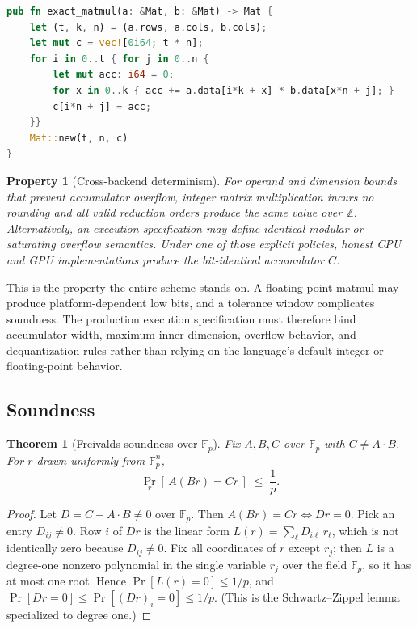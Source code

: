 \documentclass[11pt,a4paper]{article}
\newtheorem{theorem}{Theorem}
\newtheorem{property}{Property}
\begin{document}
\begin{lstlisting}[language=Rust,caption={The exact-integer matmul; identical in Go (\texttt{crypto/poi.ExactMatmul}).}]
pub fn exact_matmul(a: &Mat, b: &Mat) -> Mat {
    let (t, k, n) = (a.rows, a.cols, b.cols);
    let mut c = vec![0i64; t * n];
    for i in 0..t { for j in 0..n {
        let mut acc: i64 = 0;
        for x in 0..k { acc += a.data[i*k + x] * b.data[x*n + j]; }
        c[i*n + j] = acc;
    }}
    Mat::new(t, n, c)
}
\end{lstlisting}

\begin{property}[Cross-backend determinism]\label{prop:det}
For operand and dimension bounds that prevent accumulator overflow, integer matrix multiplication incurs no rounding and all valid reduction orders produce the same value over $\mathbb{Z}$. Alternatively, an execution specification may define identical modular or saturating overflow semantics. Under one of those explicit policies, honest CPU and GPU implementations produce the bit-identical accumulator $C$.
\end{property}

This is the property the entire scheme stands on. A floating-point matmul may produce platform-dependent low bits, and a tolerance window complicates soundness. The production execution specification must therefore bind accumulator width, maximum inner dimension, overflow behavior, and dequantization rules rather than relying on the language's default integer or floating-point behavior.

\subsection{Soundness}

\begin{theorem}[Freivalds soundness over $\mathbb{F}_p$]\label{thm:freivalds}
Fix $A, B, C$ over $\mathbb{F}_p$ with $C \neq A \cdot B$. For $r$ drawn uniformly from $\mathbb{F}_p^{n}$,
\[
  \Pr_r\!\left[\, A(Br) = Cr \,\right] \;\le\; \frac{1}{p}.
\]
\end{theorem}

\begin{proof}
Let $D = C - A\cdot B \neq 0$ over $\mathbb{F}_p$. Then $A(Br) = Cr \iff Dr = 0$. Pick an entry $D_{i j} \neq 0$. Row $i$ of $Dr$ is the linear form $L(r) = \sum_{\ell} D_{i\ell}\, r_\ell$, which is not identically zero because $D_{i j} \neq 0$. Fix all coordinates of $r$ except $r_j$; then $L$ is a degree-one nonzero polynomial in the single variable $r_j$ over the field $\mathbb{F}_p$, so it has at most one root. Hence $\Pr[L(r) = 0] \le 1/p$, and $\Pr[Dr = 0] \le \Pr[(Dr)_i = 0] \le 1/p$. (This is the Schwartz--Zippel lemma~\cite{schwartz,zippel} specialized to degree one.)
\end{proof}
\end{document}
